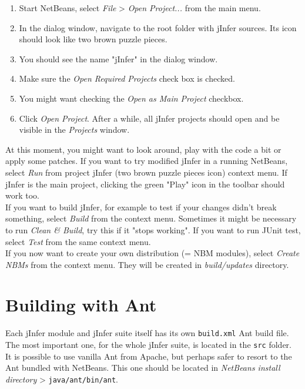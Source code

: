 \documentclass[a4paper,10pt,oneside]{article}
\begin{document}
\begin{enumerate}
	\item Start NetBeans, select \textit{File} > \textit{Open Project...} from the main menu.
	\item In the dialog window, navigate to the root folder with jInfer sources. Its icon should look like two brown puzzle pieces.
	\item You should see the name "jInfer" in the dialog window.
	\item Make sure the \textit{Open Required Projects} check box is checked.
	\item You might want checking the \textit{Open as Main Project} checkbox.
	\item Click \textit{Open Project}. After a while, all jInfer projects should open and be visible in the \textit{Projects} window.
\end{enumerate}

At this moment, you might want to look around, play with the code a bit or apply some patches. If you want to try modified jInfer in a running NetBeans, select \textit{Run} from project jInfer (two brown puzzle pieces icon) context menu. If jInfer is the main project, clicking the green "Play" icon in the toolbar should work too.\\

If you want to build jInfer, for example to test if your changes didn't break something, select \textit{Build} from the context menu. Sometimes it might be necessary to run \textit{Clean \& Build}, try this if it "stops working". If you want to run JUnit test, select \textit{Test} from the same context menu.\\

If you now want to create your own distribution (= NBM modules), select \textit{Create NBMs} from the context menu. They will be created in \textit{build/updates} directory.

\section{Building with Ant}

Each jInfer module and jInfer suite itself has its own \texttt{build.xml} Ant build file. The most important one, for the whole jInfer suite, is located in the \texttt{src} folder.\\

It is possible to use vanilla Ant from Apache, but perhaps safer to resort to the Ant bundled with NetBeans. This one should be located in \textit{NetBeans install directory} > \texttt{java/ant/bin/ant}.\\
\end{document}
